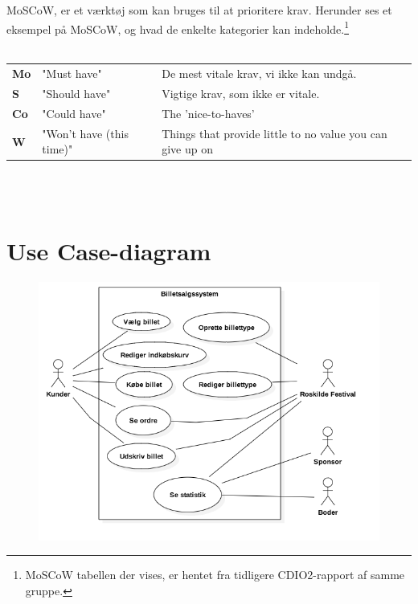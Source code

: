 MoSCoW, er et værktøj som kan bruges til at prioritere krav.
Herunder ses et eksempel på MoSCoW, og hvad de enkelte kategorier kan indeholde.\footnote{MoSCoW tabellen der vises, er hentet fra tidligere CDIO2-rapport af samme gruppe.} \\\\

\begin{tabular}{lll}
    \textbf{Mo} &   
    "Must have"                 &
    De mest vitale krav, vi ikke kan undgå. \\

    \textbf{S}  &   
    "Should have"               & 
    Vigtige krav, som ikke er vitale. \\

    \textbf{Co} &   
    "Could have"                & 
    The 'nice-to-haves' \\

    \textbf{W}  &   
    "Won’t have (this time)"    & 
    Things that provide little to no value you can give up on \\

\end{tabular}
\\\\

\section{Use Case-diagram}
\begin{figure}[H]
    \begin{center}
        \includegraphics[width=1\textwidth]{UseCaseDiagram.png}
    \end{center}
\end{figure}


